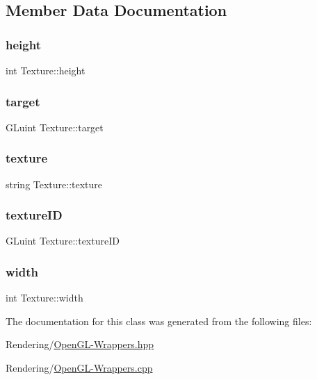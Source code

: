 \subsection{Member Data Documentation}
\mbox{\label{classTexture_ad37c395c65ff8bde86230908027a6fcd}} 
\subsubsection{\texorpdfstring{height}{height}}
{\footnotesize\ttfamily int Texture\+::height}

\mbox{\label{classTexture_adc0777da3ba92545967d6cf9b8d14926}} 
\subsubsection{\texorpdfstring{target}{target}}
{\footnotesize\ttfamily G\+Luint Texture\+::target}

\mbox{\label{classTexture_a3b01478de1035e39ed6c88f12a0d6c1c}} 
\subsubsection{\texorpdfstring{texture}{texture}}
{\footnotesize\ttfamily string Texture\+::texture}

\mbox{\label{classTexture_ab61a414e1ed356a30c48952d65227691}} 
\subsubsection{\texorpdfstring{texture\+ID}{textureID}}
{\footnotesize\ttfamily G\+Luint Texture\+::texture\+ID}

\mbox{\label{classTexture_a06a0246cb31343557c3441c5733349cd}} 
\subsubsection{\texorpdfstring{width}{width}}
{\footnotesize\ttfamily int Texture\+::width}



The documentation for this class was generated from the following files\+:\begin{DoxyCompactItemize}
\item 
Rendering/\mbox{\hyperlink{OpenGL-Wrappers_8hpp}{Open\+G\+L-\/\+Wrappers.\+hpp}}\item 
Rendering/\mbox{\hyperlink{OpenGL-Wrappers_8cpp}{Open\+G\+L-\/\+Wrappers.\+cpp}}\end{DoxyCompactItemize}
